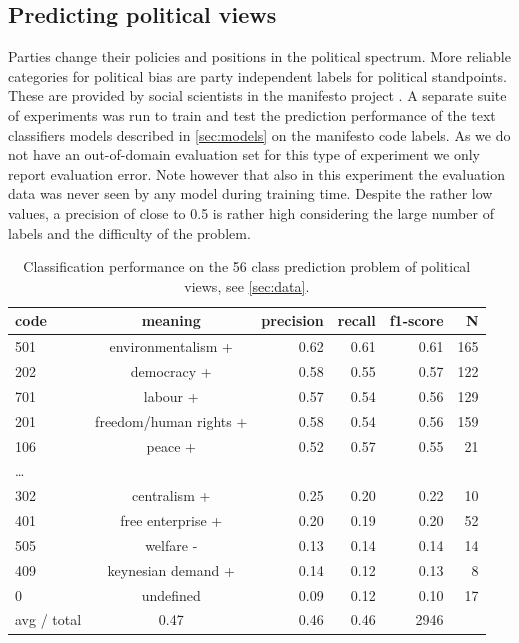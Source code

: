 \documentclass[runningheads,a4paper]{llncs}
\begin{document}
\subsection{Predicting political views}
Parties change their policies and positions in the political spectrum. More reliable categories for political bias are party independent labels for political standpoints. These are provided by social scientists in the manifesto project \cite{manifesto}. A separate suite of experiments was run to train and test the prediction performance of the text classifiers models described in \autoref{sec:models} on the manifesto code labels. As we do not have an out-of-domain evaluation set for this type of experiment we only report evaluation error. Note however that also in this experiment the evaluation data was never seen by any model during training time.
Despite the rather low values, a precision of close to 0.5 is rather high considering the large number of labels and the difficulty of the problem. \\


\begin{table}[t]
\begin{center}
\begin{tabular}{lcrrrr}
code & meaning  &      precision    &recall &  f1-score  & N\\
\hline\hline
%
       501  & environmentalism + &      0.62   &   0.61 &     0.61  &     165\\
        202 &   democracy + &   0.58  &    0.55   &   0.57   &    122\\
        701    & labour +&  0.57  &    0.54   &   0.56      & 129\\
                201    &freedom/human rights +  & 0.58   &   0.54   &   0.56   &    159\\
         106   & peace + & 0.52&      0.57   &   0.55    &    21\\
\dots\\
        302     &centralism + & 0.25     & 0.20  &    0.22  &      10\\
        401    &  free enterprise + &0.20    &  0.19    &  0.20   &     52\\
        505    &welfare - &  0.13   &   0.14   &   0.14   &     14\\
        409    & keynesian demand +&  0.14  &    0.12  &    0.13   &      8\\
            0    & undefined &  0.09  &    0.12   &   0.10    &    17\\
avg / total    &  0.47    &  0.46 &     0.46 &     2946\\
%
\end{tabular}
\end{center}
\caption{
\label{tab:results_avg_political_view}
Classification performance on the 56 class prediction problem of political views, see \autoref{sec:data}.
}
\end{table}
\end{document}
